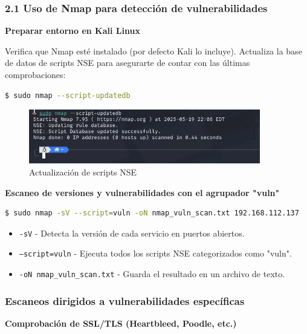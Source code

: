 \documentclass[12pt,a4paper]{article}
\begin{document}
\subsubsection{2.1 Uso de Nmap para detección de vulnerabilidades}
\textbf{Preparar entorno en Kali Linux}

Verifica que Nmap esté instalado (por defecto Kali lo incluye).
Actualiza la base de datos de scripts NSE para asegurarte de contar con las últimas comprobaciones:

\begin{lstlisting}[language=bash, caption=Actualización de scripts NSE]
$ sudo nmap --script-updatedb
\end{lstlisting}

\begin{figure}[H]
    \centering
    \includegraphics[width=0.9\textwidth]{nmap_script_update.png}
    \caption{Actualización de scripts NSE}
    \label{fig:nmap_script_update}
\end{figure}

\textbf{Escaneo de versiones y vulnerabilidades con el agrupador "vuln"}

\begin{lstlisting}[language=bash, caption=Escaneo de vulnerabilidades con NSE]
$ sudo nmap -sV --script=vuln -oN nmap_vuln_scan.txt 192.168.112.137
\end{lstlisting}

\begin{itemize}
    \item \texttt{-sV} - Detecta la versión de cada servicio en puertos abiertos.
    \item \texttt{--script=vuln} - Ejecuta todos los scripts NSE categorizados como "vuln".
    \item \texttt{-oN nmap\_vuln\_scan.txt} - Guarda el resultado en un archivo de texto.
\end{itemize}

\subsubsection{Escaneos dirigidos a vulnerabilidades específicas}
\textbf{Comprobación de SSL/TLS (Heartbleed, Poodle, etc.)}
\end{document}
